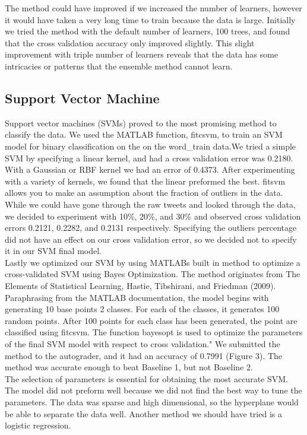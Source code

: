 \documentclass[]{article}
\begin{document}
The method could have improved if we increased the number of learners, however it would have taken a very long time to train because the data is large. Initially we tried the method with the default number of learners, 100 trees, and found that the cross validation accuracy only improved slightly. This slight improvement with triple number of learners reveals that the data has some intricacies or patterns that the ensemble method cannot learn.   


\subsection{Support Vector Machine}

Support vector machines (SVMs) proved to the most promising method to classify the data. We used the MATLAB function, fitcsvm, to train an SVM model for binary classification on the on the word\_train data.We tried a simple SVM by specifying a linear kernel, and had a  cross validation error was 0.2180. With a Gaussian or RBF kernel we had an error of 0.4373. After experimenting with a variety of kernels, we found that the linear preformed the best. fitsvm allows you to make an assumption about the fraction of outliers in the data. While we could have gone through the raw tweets and looked through the data, we decided to experiment with  10\%, 20\%, and 30\% and observed cross validation errors 0.2121, 0.2282, and 0.2131 respectively. Specifying the outliers percentage did not have an effect on our cross validation error, so we decided not to specify it in our SVM final model.  \\

Lastly we optimized our SVM by using MATLABs built in method to optimize a cross-validated SVM using Bayes Optimization.  The method originates from The Elements of Statistical Learning, Hastie, Tibshirani, and Friedman (2009). Paraphrasing from the MATLAB documentation,  the model begins with generating 10 base points 2 classes. For each of the classes, it generates 100 random points. After 100 points for each class has been generated, the point are classified using fitcsvm. The function bayesopt is used to optimize the parameters of the final SVM model with respect to cross validation." We submitted the method to the autograder, and it had an accuracy of 0.7991 (Figure 3). The method was accurate enough to beat Baseline 1, but not Baseline 2. \\

The selection of parameters is essential for obtaining the most accurate SVM. The model did not preform well because we did not find the best way to tune the parameters. The data was sparse and high dimensional, so the hyperplane would be able to separate the data well. Another method we should have tried is a logistic regression.
\end{document}
